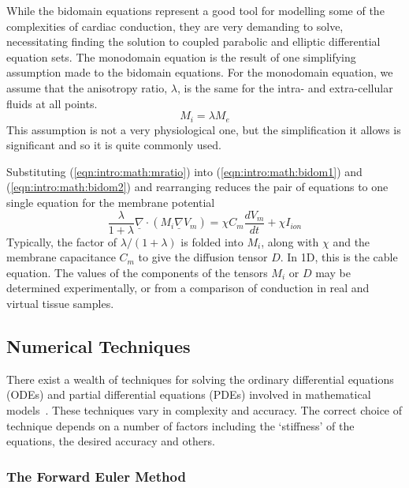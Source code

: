 While the bidomain equations represent a good tool for modelling some of the complexities of cardiac conduction, they are very demanding to solve, necessitating finding the solution to coupled parabolic and elliptic differential equation sets.
The monodomain equation is the result of one simplifying assumption made to the bidomain equations.
For the monodomain equation, we assume that the anisotropy ratio, $\lambda$, is the same for the intra- and extra-cellular fluids at all points.
\begin{equation}
M_{i} = {\lambda}M_{e}
\label{eqn:intro:math:mratio}
\end{equation}
This assumption is not a very physiological one, but the simplification it
allows is significant and so it is quite commonly used.

Substituting (\ref{eqn:intro:math:mratio}) into (\ref{eqn:intro:math:bidom1})
and (\ref{eqn:intro:math:bidom2}) and rearranging reduces the pair of equations
to one single equation for the membrane potential
\begin{equation}
\frac{\lambda}{1+\lambda}\underline{\nabla}\cdot\left(M_{i}\underline{\nabla}V_{m}\right) = \chi C_{m}\frac{dV_{m}}{dt} + \chi{I_{ion}}
\label{eqn:intro:math:mono}
\end{equation}
Typically, the factor of ${\lambda}/\left({1+\lambda}\right)$ is folded into
$M_{i}$, along with $\chi$ and the membrane capacitance $C_m$ to give the diffusion tensor $D$.
In 1D, this is the cable equation.
The values of the components of the tensors $M_{i}$ or $D$ may be determined experimentally, or from a comparison of conduction in real and virtual tissue samples.

\subsection{Numerical Techniques}

There exist a wealth of techniques for solving the ordinary differential
equations (ODEs) and partial differential equations (PDEs) involved in
mathematical models~\cite{Sundnes2006}.
These techniques vary in complexity and accuracy.
The correct choice of technique depends on a number of factors including the
`stiffness' of the equations, the desired accuracy and others.

\subsubsection{The Forward Euler Method}

